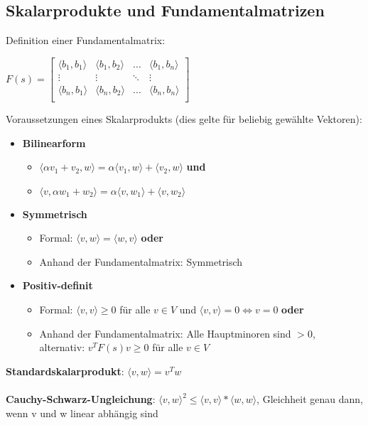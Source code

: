 \documentclass[10pt,a4paper]{article}
\begin{document}
	\subsection{Skalarprodukte und Fundamentalmatrizen}
		Definition einer Fundamentalmatrix:
		\begin{center}
			$F(s) = \begin{bmatrix}
			\langle b_1, b_1\rangle & \langle b_1, b_2\rangle & ... & \langle b_1, b_n\rangle\\
			\vdots & \vdots & \ddots & \vdots \\
			\langle b_n, b_1\rangle & \langle b_n, b_2\rangle & ... & \langle b_n, b_n\rangle\\			
			\end{bmatrix}$
		\end{center}
		Voraussetzungen eines Skalarprodukts (dies gelte für beliebig gewählte Vektoren):
		\begin{itemize}
			\item \textbf{Bilinearform}
			\begin{itemize}
				\item $\langle \alpha v_1 + v_2, w\rangle = \alpha\langle  v_1, w\rangle + \langle v_2, w\rangle$ \textbf{und}
				\item $\langle v, \alpha w_1 + w_2\rangle = \alpha\langle  v, w_1\rangle + \langle v, w_2\rangle$
			\end{itemize}
			\item \textbf{Symmetrisch}
			\begin{itemize}
				\item Formal: $\langle v, w\rangle = \langle w, v\rangle$ \textbf{oder}
				\item Anhand der Fundamentalmatrix: Symmetrisch
			\end{itemize}
			\item \textbf{Positiv-definit}
			\begin{itemize}
				\item Formal: $\langle v, v\rangle \geq 0$ für alle $v \in V$ und $\langle v, v\rangle = 0 \Leftrightarrow v = 0$ \textbf{oder}
				\item Anhand der Fundamentalmatrix: Alle Hauptminoren sind $> 0$,\\alternativ: $v^TF(s)v \geq 0$ für alle $v \in V$
			\end{itemize}
		\end{itemize}
	\textbf{Standardskalarprodukt}: $\langle v, w\rangle = v^Tw$\\\\
	\textbf{Cauchy-Schwarz-Ungleichung}: $\langle v, w\rangle^2 \leq \langle v, v\rangle * \langle w, w\rangle$, Gleichheit genau dann, wenn v und w linear abhängig sind
	
\end{document}

